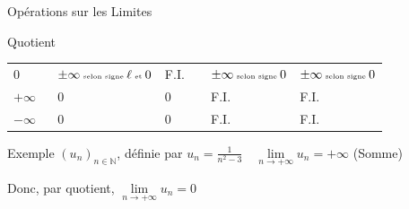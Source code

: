\documentclass{coursbook}
\begin{document}
\begin{Gpartie}{Opérations sur les Limites}
\begin{Spartie}{Quotient}
\begin{table}[H]
{\begin{tabular}{ p{0.15\linewidth} *{4}{M{0.17\linewidth} }}
                        $0$             & $\pm\infty\text{\tiny{ selon signe }}\ell\text{\tiny{ et }}0$ & F.I.& $\pm\infty\text{\tiny{ selon signe }}0$     & $\pm\infty\text{\tiny{ selon signe }}0$       \\
                        $+\infty$       & $0$                                                           & $0$ & F.I.                                        & F.I.                                          \\ 
                        $-\infty$       & $0$                                                           & $0$ & F.I.                                        & F.I.                                          \\ \bottomrule
                    \end{tabular}
                }
            \end{table}
            \begin{SSpartie}{Exemple} 
                $(u_n)_{n\in\mathbb{N}}$, définie par $u_n=\frac{1}{n^2-3}\quad\lim\limits_{n\to +\infty}u_n=+\infty$ (Somme)

                Donc, par quotient, $\lim\limits_{n\to +\infty}u_n=0$
            \end{SSpartie}
        \end{Spartie}
    \end{Gpartie}
    \pagebreak
\end{document}

